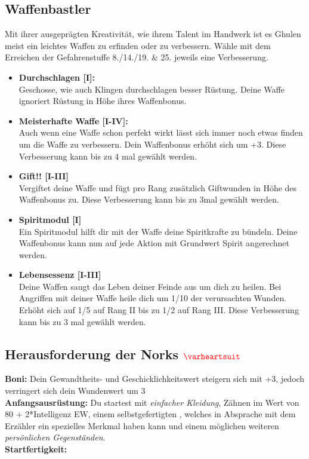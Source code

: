 \subsection*{Waffenbastler} \label{sk:waffenbastler}
Mit ihrer ausgeprägten Kreativität, wie ihrem Talent im Handwerk ist es Ghulen meist ein leichtes Waffen zu erfinden oder zu verbessern. Wähle mit dem Erreichen der Gefahrenstuffe 8./14./19. \& 25. jeweils eine Verbesserung.\\
\begin{itemize}
    \item \textbf{Durchschlagen [I]:} \\
    Geschosse, wie auch Klingen durchschlagen besser Rüstung. Deine Waffe ignoriert Rüstung in Höhe ihres Waffenbonus.
    
    \item \textbf{Meisterhafte Waffe [I-IV]:}\\
    Auch wenn eine Waffe schon perfekt wirkt lässt sich immer noch etwas finden um die Waffe zu verbessern. Dein Waffenbonus erhöht sich um +3. Diese Verbesserung kann bis zu 4 mal gewählt werden.
    
    \item \textbf{Gift!! [I-III]} \\
    Vergiftet deine Waffe und fügt pro Rang zusätzlich Giftwunden in Höhe des Waffenbonus zu. 
    Diese Verbesserung kann bis zu 3mal gewählt werden.
    
    \item \textbf{Spiritmodul [I]} \\
    Ein Spiritmodul hilft dir mit der Waffe deine Spiritkrafte zu bündeln. Deine Waffenbonus kann nun auf jede Aktion mit Grundwert Spirit angerechnet werden. 
    
    \item \textbf{Lebensessenz [I-III]} \\
    Deine Waffen saugt das Leben deiner Feinde aus um dich zu heilen. Bei Angriffen mit deiner Waffe heile dich um 1/10 der verursachten Wunden. Erhöht sich auf 1/5 auf Rang II bis zu 1/2 auf Rang III. Diese Verbesserung kann bis zu 3 mal gewählt werden.  
\end{itemize}

\subsection*{Herausforderung der Norks $\Herz{}$}
\textbf{Boni:} Dein Gewandtheits- und Geschicklichkeitswert steigern sich mit +3, jedoch verringert sich dein Wundenwert um 3 \\
\textbf{Anfangsausrüstung:} Du startest mit \textit{einfacher Kleidung}, Zähnen im Wert von 80 + 2*Intelligenz EW, einem selbstgefertigten , welches in Absprache mit dem Erzähler ein spezielles Merkmal haben kann und einem möglichen weiteren \textit{persönlichen Gegenständen}. \\
\textbf{Startfertigkeit:} 

